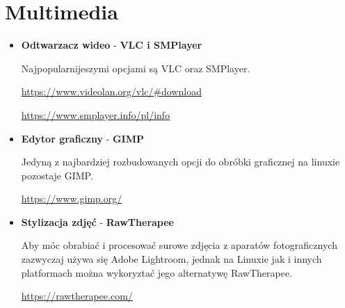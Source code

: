 \documentclass[10pt,a4paper]{report}
\begin{document}
\section{Multimedia}
\begin{itemize}

\item \textbf{Odtwarzacz wideo} - \textbf{VLC i SMPlayer} \par Najpopularnijeszymi opcjami są VLC oraz SMPlayer. \par \url{https://www.videolan.org/vlc/#download}\par \url{https://www.smplayer.info/pl/info}\\

\item \textbf{Edytor graficzny} - \textbf{GIMP} \par Jedyną z najbardziej rozbudowanych opcji do obróbki graficznej na linuxie pozostaje GIMP. \par \url{https://www.gimp.org/}\\

\item \textbf{Stylizacja zdjęć} - \textbf{RawTherapee} \par Aby móc obrabiać i procesować surowe zdjęcia z aparatów fotograficznych zazwyczaj używa się Adobe Lightroom, jednak na Linuxie jak i innych platformach można wykoryztać jego alternatywę RawTherapee.\par \url{https://rawtherapee.com/}

\end{itemize}
\end{document}
